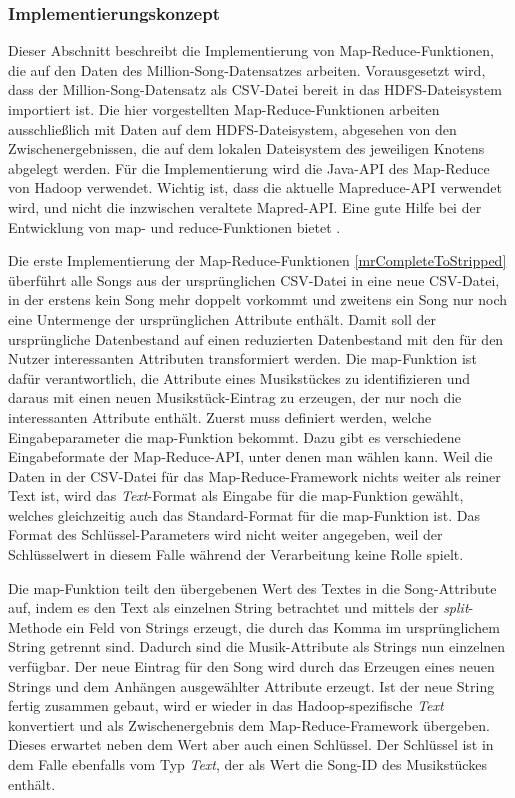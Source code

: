 \subsubsection{Implementierungskonzept}

Dieser Abschnitt beschreibt die Implementierung von Map-Reduce-Funktionen, die auf den Daten
des Million-Song-Datensatzes arbeiten. Vorausgesetzt wird, dass der Million-Song-Datensatz als
CSV-Datei bereit in das HDFS-Dateisystem importiert ist. Die hier vorgestellten Map-Reduce-Funktionen
arbeiten ausschließlich mit Daten auf dem HDFS-Dateisystem, abgesehen von den Zwischenergebnissen,
die auf dem lokalen Dateisystem des jeweiligen Knotens abgelegt werden.
Für die Implementierung wird die Java-API des Map-Reduce von Hadoop verwendet. Wichtig ist,
dass die aktuelle Mapreduce-API verwendet wird, und nicht die inzwischen veraltete Mapred-API.
Eine gute Hilfe bei der Entwicklung von map- und reduce-Funktionen bietet \cite{miner2012mapreduce}.

Die erste Implementierung der Map-Reduce-Funktionen \ref{mrCompleteToStripped} überführt alle Songs aus der ursprünglichen
CSV-Datei in eine neue CSV-Datei, in der erstens kein Song mehr doppelt vorkommt und zweitens
ein Song nur noch eine Untermenge der ursprünglichen Attribute enthält. Damit soll der ursprüngliche
Datenbestand auf einen reduzierten Datenbestand mit den für den Nutzer interessanten Attributen 
transformiert werden. Die map-Funktion ist dafür verantwortlich, die Attribute eines Musikstückes
zu identifizieren und daraus mit einen neuen Musikstück-Eintrag zu erzeugen, der nur noch die interessanten
Attribute enthält.
Zuerst muss definiert werden, welche Eingabeparameter die map-Funktion bekommt. Dazu gibt es verschiedene
Eingabeformate der Map-Reduce-API, unter denen man wählen kann. Weil die Daten in der CSV-Datei für das
Map-Reduce-Framework nichts weiter als reiner Text ist, wird das \textit{Text}-Format als Eingabe für
die map-Funktion gewählt, welches gleichzeitig auch das Standard-Format für die map-Funktion ist.
Das Format des Schlüssel-Parameters wird nicht weiter angegeben, weil der Schlüsselwert in diesem Falle 
während der Verarbeitung keine Rolle spielt.

Die map-Funktion teilt den übergebenen Wert des Textes in die Song-Attribute auf, indem es den Text
als einzelnen String betrachtet und mittels der \textit{split}-Methode ein Feld von Strings erzeugt, die durch
das Komma im ursprünglichem String getrennt sind. Dadurch sind die Musik-Attribute als Strings nun einzelnen verfügbar.
Der neue Eintrag für den Song wird durch das Erzeugen eines neuen Strings und dem Anhängen ausgewählter
Attribute erzeugt. Ist der neue String fertig zusammen gebaut, wird er wieder in das Hadoop-spezifische \textit{Text}
konvertiert und als Zwischenergebnis dem Map-Reduce-Framework übergeben. Dieses erwartet neben dem 
Wert aber auch einen Schlüssel. Der Schlüssel ist in dem Falle ebenfalls vom Typ \textit{Text}, der als Wert die
Song-ID des Musikstückes enthält.


